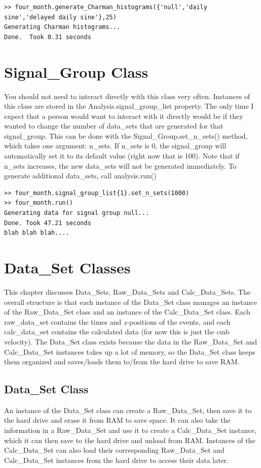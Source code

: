 \documentclass[12pt]{report}
\begin{document}
\begin{verbatim}
>> four_month.generate_Charman_histograms({'null','daily sine','delayed daily sine'},25)
Generating Charman histograms...
Done.  Took 0.31 seconds
\end{verbatim}





\chapter{Signal\_Group Class}
You should not need to interact directly with this class very often.  Instances of this class are stored in the Analysis.signal\_group\_list property.  The only time I expect that a person would want to interact with it directly would be if they wanted to change the number of data\_sets that are generated for that signal\_group.  This can be done with the Signal\_Group.set\_n\_sets() method, which takes one argument: n\_sets.  If n\_sets is 0, the signal\_group will automatically set it to its default value (right now that is 100).  Note that if n\_sets increases, the new data\_sets will not be generated immediately.  To generate additional data\_sets, call analysis.run()

\begin{verbatim}
>> four_month.signal_group_list{1}.set_n_sets(1000)
>> four_month.run()
Generating data for signal group null...
Done. Took 47.21 seconds
blah blah blah....
\end{verbatim}





\chapter{Data\_Set Classes}
\label{chap:DataSet}
This chapter discusses Data\_Sets, Raw\_Data\_Sets and Calc\_Data\_Sets.  The overall structure is that each instance of the Data\_Set class manages an instance of the Raw\_Data\_Set class and an instance of the Calc\_Data\_Set class.  Each raw\_data\_set contains the times and $z$-positions of the events, and each calc\_data\_set contains the calculated data (for now this is just the cmb velocity).  The Data\_Set class exists because the data in the Raw\_Data\_Set and Calc\_Data\_Set instances takes up a lot of memory, so the Data\_Set class keeps them organized and saves/loads them to/from the hard drive to save RAM.

\section{Data\_Set Class}
An instance of the Data\_Set class can create a Raw\_Data\_Set, then save it to the hard drive and erase it from RAM to save space.  It can also take the information in a Raw\_Data\_Set and use it to create a Calc\_Data\_Set instance, which it can then save to the hard drive and unload from RAM.  Instances of the Calc\_Data\_Set can also load their corresponding Raw\_Data\_Set and Calc\_Data\_Set instances from the hard drive to access their data later.
\end{document}
